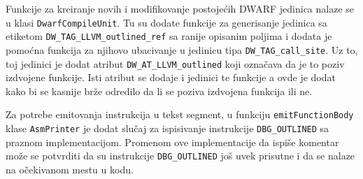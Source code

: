 \documentclass[12pt,oneside]{memoir}
\begin{document}
Funkcije za kreiranje novih i modifikovanje postojećih DWARF jedinica nalaze se u klasi \verb|DwarfCompileUnit|.
Tu su dodate funkcije za generisanje jedinica sa etiketom \verb|DW_TAG_LLVM_outlined_ref| sa ranije opisanim poljima i dodata je pomoćna funkcija za njihovo ubacivanje u jedinicu tipa \verb|DW_TAG_call_site|.
Uz to, toj jedinici je dodat atribut \verb|DW_AT_LLVM_outlined| koji označava da je to poziv izdvojene funkcije.
Isti atribut se dodaje i jedinici te funkcije a ovde je dodat kako bi se kasnije brže odredilo da li se poziva izdvojena funkcija ili ne.

Za potrebe emitovanja instrukcija u tekst segment, u funkciju \verb|emitFunctionBody| klase \verb|AsmPrinter| je dodat slučaj za ispisivanje instrukcije \verb|DBG_OUTLINED| sa praznom implementacijom.
Promenom ove implementacije da ispiše komentar može se potvrditi da su instrukcije \verb|DBG_OUTLINED| još uvek prisutne i da se nalaze na očekivanom mestu u kodu.
\end{document}
